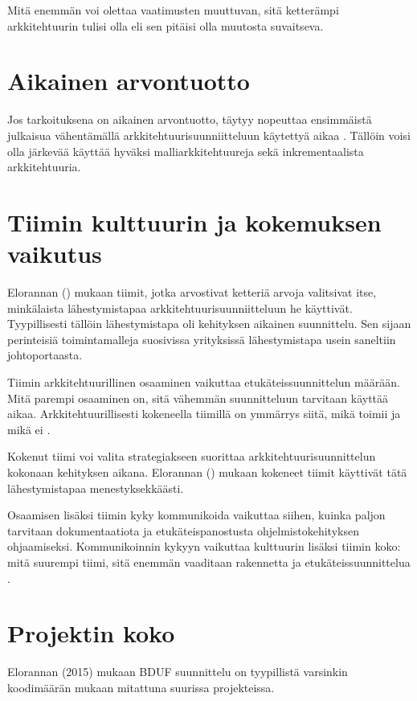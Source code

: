 Mitä enemmän voi olettaa vaatimusten muuttuvan, sitä ketterämpi arkkitehtuurin tulisi olla eli sen pitäisi olla muutosta suvaitseva.

\section{Aikainen arvontuotto}

Jos tarkoituksena on aikainen arvontuotto, täytyy nopeuttaa ensimmäistä julkaisua vähentämällä arkkitehtuurisuunniitteluun käytettyä aikaa \citep{waterman_how_2015}. Tällöin voisi olla järkevää käyttää hyväksi malliarkkitehtuureja sekä inkrementaalista arkkitehtuuria.

\section{Tiimin kulttuurin ja kokemuksen vaikutus}

Elorannan (\citeyear{eloranta2015techniques}) mukaan tiimit, jotka arvostivat ketteriä arvoja valitsivat itse, minkälaista lähestymistapaa arkkitehtuurisuunniitteluun he käyttivät. Tyypillisesti tällöin lähestymistapa oli kehityksen aikainen suunnittelu. Sen sijaan perinteisiä toimintamalleja suosivissa yrityksissä lähestymistapa usein saneltiin johtoportaasta. 

Tiimin arkkitehtuurillinen osaaminen vaikuttaa etukäteissuunnittelun määrään. Mitä parempi osaaminen on, sitä vähemmän suunnitteluun tarvitaan käyttää aikaa. Arkkitehtuurillisesti kokeneella tiimillä on ymmärrys siitä, mikä toimii ja mikä ei \citep{waterman_how_2015}.

Kokenut tiimi voi valita strategiakseen suorittaa arkkitehtuurisuunnittelun kokonaan kehityksen aikana. Elorannan (\citeyear{eloranta2015techniques}) mukaan kokeneet tiimit käyttivät tätä lähestymistapaa menestyksekkäästi.

Osaamisen lisäksi tiimin kyky kommunikoida vaikuttaa siihen, kuinka paljon tarvitaan dokumentaatiota ja etukäteispanostusta ohjelmistokehityksen ohjaamiseksi. Kommunikoinnin kykyyn vaikuttaa kulttuurin lisäksi tiimin koko: mitä suurempi tiimi, sitä enemmän vaaditaan rakennetta ja etukäteissuunnittelua \citep{waterman_how_2015}.

\section{Projektin koko}

Elorannan (2015) mukaan BDUF suunnittelu on tyypillistä varsinkin koodimäärän mukaan mitattuna suurissa projekteissa. 

